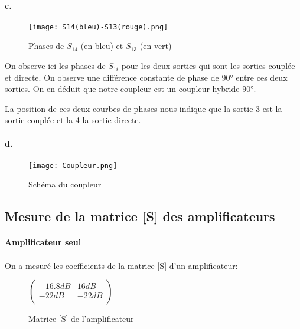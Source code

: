 \documentclass[oneside,a4paper,12pt]{article}
\begin{document}
	\paragraph{c.}
	\begin{figure}
		\centering
		\texttt{[image: S14(bleu)-S13(rouge).png]}
		\caption{Phases de $S_{14}$ (en bleu) et $S_{13}$ (en vert)}
	\end{figure}

	On observe ici les phases de $S_{1i}$ pour les deux sorties qui sont les sorties couplée et directe.
	On observe une différence constante de phase de 90° entre ces deux sorties. On en déduit que notre coupleur est un coupleur hybride 90°. 

	La position de ces deux courbes de phases nous indique que la sortie 3 est la sortie couplée et la 4 la sortie directe.

	\paragraph{d.}
	\paragraph{}
	\begin{figure}[h]
		\centering
		\texttt{[image: Coupleur.png]}
		\caption{Schéma du coupleur}		
	\end{figure}

	\subsection{Mesure de la matrice [S] des amplificateurs}
	\paragraph{Amplificateur seul} \paragraph{}
	On a mesuré les coefficients de la matrice [S] d'un amplificateur:
	\begin{figure}[h]
		\centering
		$
		\begin{pmatrix}
			-16.8 dB & 16 dB \\
			-22 dB & -22 dB \\
		\end{pmatrix}
		$
		\caption{Matrice [S] de l'amplificateur}
	\end{figure}
\end{document}
